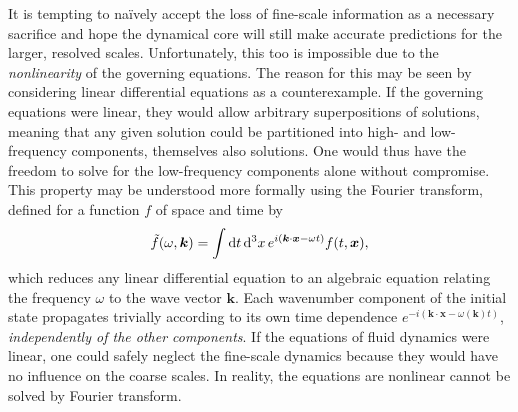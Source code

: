 \documentclass[titlepage,twoside]{article}
\numberwithin{equation}{section}
\renewcommand{\d}[1]{\mathrm{d}#1}
\renewcommand\vec{\bm}
\begin{document}
It is tempting to na\"{i}vely accept the loss of fine-scale information as a
necessary sacrifice and hope the dynamical core will still make accurate
predictions for the larger, resolved scales. Unfortunately, this too is
impossible due to the \emph{nonlinearity} of the governing equations. The
reason for this may be seen by considering linear differential equations as a
counterexample. If the governing equations were linear, they would allow
arbitrary superpositions of solutions, meaning that any given solution could be
partitioned into high- and low-frequency components, themselves also solutions.
One would thus have the freedom to solve for the low-frequency components alone
without compromise. This property may be understood more formally using the
Fourier transform, defined for a function $f$ of space and time by
\[
    \tilde{f}(\omega, \vec{k})
        = \int \d{t}\,\d^3{x}\, e^{i(\vec{k} \cdot \vec{x} - \omega t)}
        f(t, \vec{x}),
\]
which reduces any linear differential equation to an algebraic equation
relating the frequency $\omega$ to the wave vector $\vec{k}$. Each wavenumber
component of the initial state propagates trivially according to its own
time dependence $e^{-i(\vec{k} \cdot \vec{x} - \omega(\vec{k}) t)}$,
\emph{independently of the other components}. If the equations of fluid
dynamics were linear, one could safely neglect the fine-scale dynamics because
they would have no influence on the coarse scales. In reality, the equations
are nonlinear cannot be solved by Fourier transform.
\end{document}
